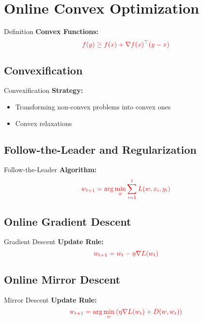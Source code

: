 \documentclass{beamer}
\begin{document}
\section{Online Convex Optimization}
\begin{frame}{Definition}
    \textbf{Convex Functions:}
    \begin{equation}
        \textcolor{red}{f(y) \geq f(x) + \nabla f(x)^{\top} (y - x)}
    \end{equation}
\end{frame}

\subsection{Convexification}
\begin{frame}{Convexification}
    \textbf{Strategy:}
    \begin{itemize}
        \item Transforming non-convex problems into convex ones
        \item Convex relaxations
    \end{itemize}
\end{frame}

\subsection{Follow-the-Leader and Regularization}
\begin{frame}{Follow-the-Leader}
    \textbf{Algorithm:}
    \begin{equation}
        \textcolor{red}{w_{t+1} = \arg\min_w \sum_{i=1}^{t} L(w, x_i, y_i)}
    \end{equation}
\end{frame}

\subsection{Online Gradient Descent}
\begin{frame}{Gradient Descent}
    \textbf{Update Rule:}
    \begin{equation}
        \textcolor{red}{w_{t+1} = w_t - \eta \nabla L(w_t)}
    \end{equation}
\end{frame}

\subsection{Online Mirror Descent}
\begin{frame}{Mirror Descent}
    \textbf{Update Rule:}
    \begin{equation}
        \textcolor{red}{w_{t+1} = \arg\min_w \left( \eta \nabla L(w_t) + D(w, w_t) \right)}
    \end{equation}
\end{frame}
\end{document}
